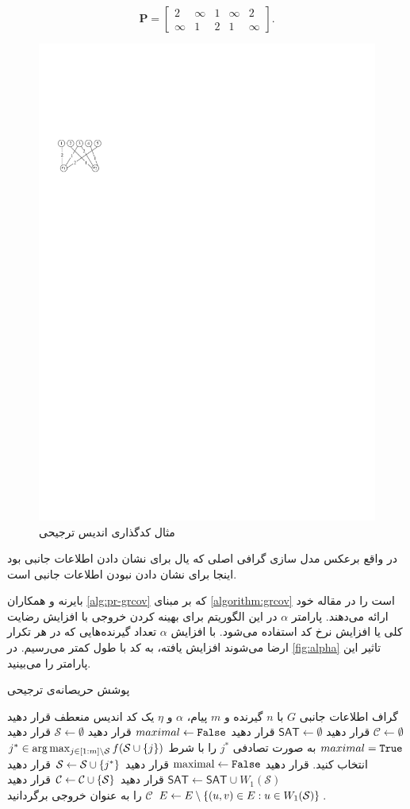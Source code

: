 \begin{example}
\begin{equation*}
	\boldsymbol{P} = 
	\begin{bmatrix}
		2 & \infty & 1 &\infty & 2\\
		\infty & 1 & 2 & 1 & \infty \label{eq:ppicod-instance}
	\end{bmatrix}.
\end{equation*}
\begin{figure}[H]
	\centering
	\includegraphics[width=0.2\linewidth]{figs/chapter4/ppgraph.pdf}
	\caption[
	مثال کدگذاری اندیس ترجیحی
	]{
		مثال کدگذاری اندیس ترجیحی
		\cite{byrne2023preferential}
		}
	\label{fig:ppgraph}
\end{figure}
در واقع برعکس مدل سازی گرافی اصلی که یال برای نشان دادن اطلاعات جانبی بود اینجا برای نشان دادن نبودن اطلاعات جانبی است.
\end{example}
بایرنه و همکاران
\autoref{alg:pr-grcov}
 که بر مبنای 
 \autoref{algorithm:grcov}
  است را در مقاله خود ارائه می‌دهند. پارامتر 
 $\alpha$
 در این الگوریتم برای بهینه کردن خروجی با افزایش رضایت کلی یا افزایش نرخ کد استفاده می‌‌شود. با افزایش 
 $\alpha$
 تعداد گیرنده‌هایی که در هر تکرار ارضا می‌شوند افزایش یافته، به کد با طول کمتر می‌رسیم. در 
 \autoref{fig:alpha}
 تاثیر این پارامتر را می‌بینید.
\begin{algorithm}
	\caption[
		پوشش حریصانه‌ی ترجیحی
	]{
		پوشش حریصانه‌ی ترجیحی
	}
	\label{alg:pr-grcov}
	\begin{algorithmic}[1]
		\Require
			گراف اطلاعات جانبی
		$G$
		با
		$n$
		گیرنده و
		$m$
		پیام،
		$\alpha$
		و
		$\eta$
		\Ensure
		یک کد  اندیس منعطف
		\State قرار دهید
		$\mathcal{C} \gets \emptyset$
		\State قرار دهید
		$\mathsf{SAT} \gets \emptyset$ 
		\State قرار دهید
		$maximal \gets \texttt{False}$
		\State قرار دهید
		$\mathcal{S} \gets \emptyset$
		\State قرار دهید
		$maximal = \texttt{True}$
		\State
		به صورت تصادفی
		$j^{\ast}$
		را با شرط
		$j^* \in \arg \max_{j \in [1:m] \setminus \mathcal{S}} f(\mathcal{S} \cup \left\{ j \right\})$
		انتخاب کنید.
		\State قرار دهید
		$\textrm{maximal} \gets \texttt{False}$
		\State قرار دهید
		$\mathcal{S} \gets \mathcal{S} \cup \left\{ j^* \right\}$
		\EndIf
		\EndWhile
		\State قرار دهید
		 $\mathsf{SAT} \gets \mathsf{SAT} \cup W_1(\mathcal{S})$
		\State قرار دهید
		$\mathcal{C} \gets \mathcal{C} \cup \left\{ \mathcal{S} \right\}$
		\State قرار دهید
		$E \gets E \setminus \left\{  (u,v) \in E: u \in W_1(\mathcal{S}) \right\}$
		\EndWhile
		\State $\mathcal{C}$
		را به عنوان خروجی برگردانید.
	\end{algorithmic}
\end{algorithm}

